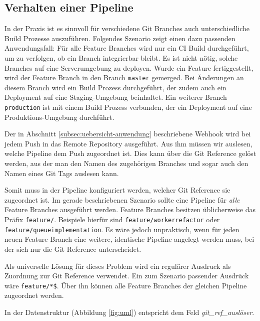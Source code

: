 \subsection{Verhalten einer Pipeline}

In der Praxis ist es sinnvoll für verschiedene Git Branches auch unterschiedliche Build Prozesse auszuführen. Folgendes Szenario zeigt einen dazu passenden Anwendungsfall: Für alle Feature Branches wird nur ein \ac{CI} Build durchgeführt, um zu verfolgen, ob ein Branch integrierbar bleibt. Es ist nicht nötig, solche Branches auf eine Serverumgebung zu deployen. Wurde ein Feature fertiggestellt, wird der Feature Branch in den Branch \texttt{master} gemerged. Bei Änderungen an diesem Branch wird ein Build Prozess durchgeführt, der zudem auch ein Deployment auf eine Staging-Umgebung beinhaltet. Ein weiterer Branch \texttt{production} ist mit einem Build Prozess verbunden, der ein Deployment auf eine Produktions-Umgebung durchführt.

Der in Abschnitt \ref{subsec:uebersicht-anwendung} beschriebene Webhook wird bei jedem Push in das Remote Repository ausgeführt. Aus ihm müssen wir auslesen, welche Pipeline dem Push zugeordnet ist. Dies kann über die Git Reference gelöst werden, aus der man den Namen des zugehörigen Branches und sogar auch den Namen eines Git Tags auslesen kann.

Somit muss in der Pipeline konfiguriert werden, welcher Git Reference sie zugeordnet ist. Im gerade beschriebenen Szenario sollte eine Pipeline für \emph{alle} Feature Branches ausgeführt werden. Feature Branches besitzen üblicherweise das Präfix \texttt{feature/}. Beispiele hierfür sind \texttt{feature/worker\-refactor} oder \texttt{feature/queue\-implementation}. Es wäre jedoch unpraktisch, wenn für jeden neuen Feature Branch eine weitere, identische Pipeline angelegt werden muss, bei der sich nur die Git Reference unterscheidet.

Als universelle Lösung für dieses Problem wird ein regulärer Ausdruck als Zuordnung zur Git Reference verwendet. Ein zum Szenario passender Ausdrück wäre \texttt{feature/*\$}. Über ihn können alle Feature Branches der gleichen Pipeline zugeordnet werden.

In der Datenstruktur (Abbildung \ref{fig:uml}) entspricht dem Feld \emph{git\_ref\_auslöser}.

